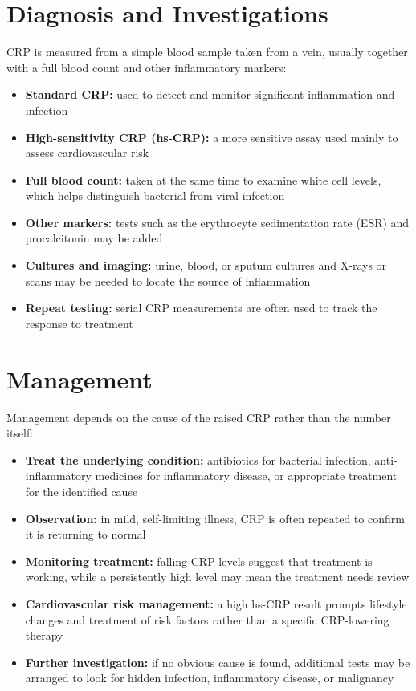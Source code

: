 \section*{Diagnosis and Investigations}
CRP is measured from a simple blood sample taken from a vein, usually together with a full blood count and other inflammatory markers:
\begin{itemize}
    \item \textbf{Standard CRP:} used to detect and monitor significant inflammation and infection
    \item \textbf{High-sensitivity CRP (hs-CRP):} a more sensitive assay used mainly to assess cardiovascular risk
    \item \textbf{Full blood count:} taken at the same time to examine white cell levels, which helps distinguish bacterial from viral infection
    \item \textbf{Other markers:} tests such as the erythrocyte sedimentation rate (ESR) and procalcitonin may be added
    \item \textbf{Cultures and imaging:} urine, blood, or sputum cultures and X-rays or scans may be needed to locate the source of inflammation
    \item \textbf{Repeat testing:} serial CRP measurements are often used to track the response to treatment
\end{itemize}

\section*{Management}
Management depends on the cause of the raised CRP rather than the number itself:
\begin{itemize}
    \item \textbf{Treat the underlying condition:} antibiotics for bacterial infection, anti-inflammatory medicines for inflammatory disease, or appropriate treatment for the identified cause
    \item \textbf{Observation:} in mild, self-limiting illness, CRP is often repeated to confirm it is returning to normal
    \item \textbf{Monitoring treatment:} falling CRP levels suggest that treatment is working, while a persistently high level may mean the treatment needs review
    \item \textbf{Cardiovascular risk management:} a high hs-CRP result prompts lifestyle changes and treatment of risk factors rather than a specific CRP-lowering therapy
    \item \textbf{Further investigation:} if no obvious cause is found, additional tests may be arranged to look for hidden infection, inflammatory disease, or malignancy
\end{itemize}

